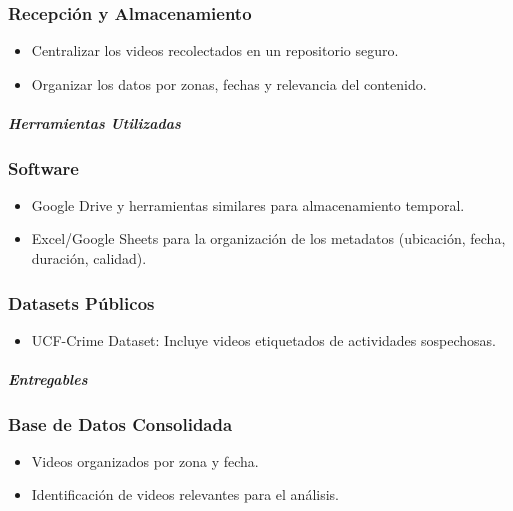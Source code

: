 \subsubsection{Recepción y Almacenamiento}
\begin{itemize}
    \item Centralizar los videos recolectados en un repositorio seguro.
    \item Organizar los datos por zonas, fechas y relevancia del contenido.
\end{itemize}


\paragraph{\textit{Herramientas Utilizadas}}

\subsubsection{Software}
\begin{itemize}
    \item Google Drive y herramientas similares para almacenamiento temporal.
    \item Excel/Google Sheets para la organización de los metadatos (ubicación, fecha, duración, calidad).
\end{itemize}

\subsubsection{Datasets Públicos}
\begin{itemize}
    \item UCF-Crime Dataset: Incluye videos etiquetados de actividades sospechosas.
\end{itemize}

\paragraph{\textit{Entregables}}

\subsubsection{Base de Datos Consolidada}
\begin{itemize}
    \item Videos organizados por zona y fecha.
    \item Identificación de videos relevantes para el análisis.
\end{itemize}

